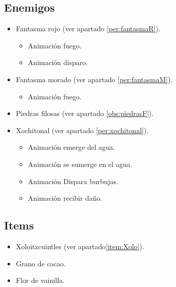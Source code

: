 	\subsection{Enemigos}
	\begin{itemize}
		\item Fantasma rojo (ver apartado \ref{per:fantasmaR}).
			\begin{itemize}
				\item Animación fuego.
				\item Animación disparo.
			\end{itemize}
		\item Fantasma morado (ver apartado \ref{per:fantasmaM}).
			\begin{itemize}
				\item Animación fuego.
			\end{itemize}
		\item Piedras filosas (ver apartado \ref{obs:piedrasF}).
		\item Xochitonal (ver apartado \ref{per:xochitonal}).
			\begin{itemize}
				\item Animación emerge del agua.
				\item Animación se sumerge en el agua.
				\item Animación Dispara burbujas.  
				\item Animación recibir daño.
			\end{itemize}
	\end{itemize}
	\subsection{Items}
	\begin{itemize}
		\item Xoloitzcuintles (ver apartado\ref{item:Xolo}).
		\item Grano de cacao.
		\item Flor de vainilla.
	\end{itemize}
